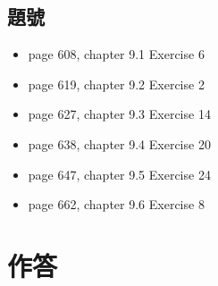 \documentclass[sigconf]{acmart}
\begin{document}
\subsection{題號}
\begin{shaded}
\begin{itemize}
    \item[-] page 608, chapter 9.1 Exercise 6
    \item[-] page 619, chapter 9.2 Exercise 2
    \item[-] page 627, chapter 9.3 Exercise 14
    \item[-] page 638, chapter 9.4 Exercise 20
    \item[-] page 647, chapter 9.5 Exercise 24
    \item[-] page 662, chapter 9.6 Exercise 8
\end{itemize}
\end{shaded}


\section{作答}
\end{document}
